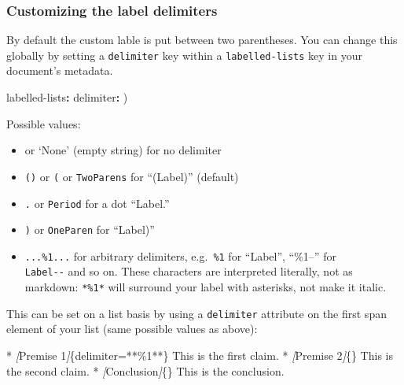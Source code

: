 \documentclass[
]{article}
\newenvironment{Shaded}{}{}
\newcommand{\AttributeTok}[1]{\textcolor[rgb]{0.49,0.56,0.16}{#1}}
\newcommand{\CommentTok}[1]{\textcolor[rgb]{0.38,0.63,0.69}{\textit{#1}}}
\newcommand{\FunctionTok}[1]{\textcolor[rgb]{0.02,0.16,0.49}{#1}}
\newcommand{\KeywordTok}[1]{\textcolor[rgb]{0.00,0.44,0.13}{\textbf{#1}}}
\newcommand{\NormalTok}[1]{#1}
\newcommand{\OtherTok}[1]{\textcolor[rgb]{0.00,0.44,0.13}{#1}}
\newcommand{\SpecialStringTok}[1]{\textcolor[rgb]{0.73,0.40,0.53}{#1}}
\providecommand{\tightlist}{%
  \setlength{\itemsep}{0pt}\setlength{\parskip}{0pt}}
\begin{document}
\hypertarget{customizing-the-label-delimiters}{%
\subsubsection{Customizing the label
delimiters}\label{customizing-the-label-delimiters}}

By default the custom lable is put between two parentheses. You can
change this globally by setting a \texttt{delimiter} key within a
\texttt{labelled-lists} key in your document's metadata.

\begin{Shaded}
\begin{Highlighting}[]
\FunctionTok{labelled{-}lists}\KeywordTok{:}
\AttributeTok{  }\FunctionTok{delimiter}\KeywordTok{:}\AttributeTok{ )}
\end{Highlighting}
\end{Shaded}

Possible values:

\begin{itemize}
\tightlist
\item
  \texttt{\textquotesingle{}\textquotesingle{}} or `None' (empty string)
  for no delimiter
\item
  \texttt{()} or \texttt{(} or \texttt{TwoParens} for ``(Label)''
  (default)
\item
  \texttt{.} or \texttt{Period} for a dot ``Label.''
\item
  \texttt{)} or \texttt{OneParen} for ``Label)''
\item
  \texttt{...\%1...} for arbitrary delimiters,
  e.g.~\texttt{\textbar{}\%1\textbar{}} for
  ``\textbar Label\textbar{}'', ``\%1--'' for\\
  \texttt{Label-\/-} and so on. These characters are interpreted
  literally, not as markdown: \texttt{*\%1*} will surround your label
  with asterisks, not make it italic.
\end{itemize}

This can be set on a list basis by using a \texttt{delimiter} attribute
on the first span element of your list (same possible values as above):

\begin{Shaded}
\begin{Highlighting}[]
\SpecialStringTok{* }\CommentTok{[}\OtherTok{Premise 1}\CommentTok{]}\NormalTok{\{delimiter=\textquotesingle{}**\%1**\textquotesingle{}\} This is the first claim.}
\SpecialStringTok{* }\CommentTok{[}\OtherTok{Premise 2}\CommentTok{]}\NormalTok{\{\} This is the second claim.}
\SpecialStringTok{* }\CommentTok{[}\OtherTok{Conclusion}\CommentTok{]}\NormalTok{\{\} This is the conclusion.}
\end{Highlighting}
\end{Shaded}
\end{document}
